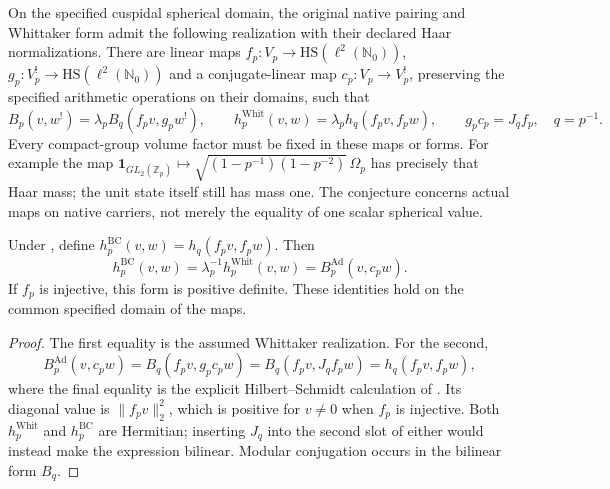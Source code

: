 \begin{conjecture}
\label{v4-arith:bcglue-k5:conj:local-comparison-datum}
On the specified cuspidal spherical domain, the original native pairing
and Whittaker form admit the following realization with their declared
Haar normalizations. There are linear maps
\(f_p:V_p\to\mathrm{HS}(\ell^2(\mathbb N_0))\),
\(g_p:V_p^!\to\mathrm{HS}(\ell^2(\mathbb N_0))\) and a
conjugate-linear map \(c_p:V_p\to V_p^!\), preserving the specified
arithmetic operations on their domains, such that
\[
 B_p(v,w^!)=\lambda_p B_q(f_pv,g_pw^!),\qquad
 h_p^{\mathrm{Whit}}(v,w)=\lambda_p h_q(f_pv,f_pw),\qquad
 g_pc_p=J_qf_p,
 \quad q=p^{-1}.
\]
Every compact-group volume factor must be fixed in these maps or forms.
For example the map \(\mathbf1_{GL_2(\mathbb Z_p)}\mapsto
\sqrt{(1-p^{-1})(1-p^{-2})}\,\Omega_p\) has precisely that Haar mass;
the unit state itself still has mass one. The conjecture concerns
actual maps on native carriers, not merely the equality of one scalar
spherical value.
\end{conjecture}

\begin{theorem}
\label{v4-arith:bcglue-k5:thm:K5-absorption-canonical}
Under , define
\(h_p^{\mathrm{BC}}(v,w)=h_q(f_pv,f_pw)\). Then
\begin{equation}
 h_p^{\mathrm{BC}}(v,w)=\lambda_p^{-1}h_p^{\mathrm{Whit}}(v,w)
                       =B_p^{\mathrm{Ad}}(v,c_pw).
 \label{v4-arith:bcglue-k5:eq:K5-match}
\end{equation}
If \(f_p\) is injective, this form is positive definite. These
identities hold on the common specified domain of the maps.
\end{theorem}
\begin{proof}
The first equality is the assumed Whittaker realization. For the second,
\[
 B_p^{\mathrm{Ad}}(v,c_pw)=B_q(f_pv,g_pc_pw)
  =B_q(f_pv,J_qf_pw)=h_q(f_pv,f_pw),
\]
where the final equality is the explicit Hilbert--Schmidt calculation
of . Its diagonal value is
\(\|f_pv\|_2^2\), which is positive for \(v\ne0\) when \(f_p\)
is injective. Both \(h_p^{\mathrm{Whit}}\) and \(h_p^{\mathrm{BC}}\)
are Hermitian; inserting \(J_q\) into the second slot of either would
instead make the expression bilinear. Modular conjugation occurs in
the bilinear form \(B_q\).
\end{proof}

